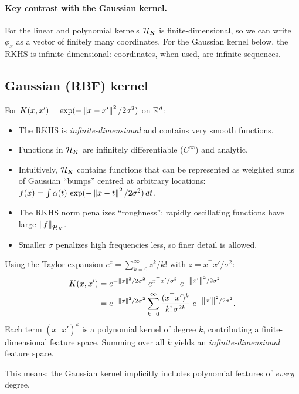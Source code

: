 \begin{notechapter}
\paragraph{Key contrast with the Gaussian kernel.}
For the linear and polynomial kernels $\mathcal{H}_K$ is finite-dimensional, so we can
write $\phi_x$ as a vector of finitely many coordinates. For the
Gaussian kernel below, the RKHS is
infinite-dimensional: coordinates, when used, are infinite sequences.

\subsection{Gaussian (RBF) kernel}

For $K(x,x') = \exp(-\left\|x-x'\right\|^2/2\sigma^2)$ on $\mathbb{R}^d$:
\begin{itemize}
  \item The RKHS is \emph{infinite-dimensional} and contains very
  smooth functions.
  \item Functions in $\mathcal{H}_K$ are infinitely differentiable ($C^\infty$)
  and analytic.
  \item Intuitively, $\mathcal{H}_K$ contains functions that can be represented as
  weighted sums of Gaussian ``bumps'' centred at arbitrary locations:
  $f(x) = \int \alpha(t)\,\exp(-\left\|x-t\right\|^2/2\sigma^2)\,dt$.
  \item The RKHS norm penalizes ``roughness'': rapidly oscillating
  functions have large $\left\|f\right\|_{\mathcal{H}_K}$.
  \item Smaller $\sigma$ penalizes high frequencies less, so finer detail is
  allowed.
\end{itemize}

\begin{intuition}
Using the Taylor expansion $e^z = \sum_{k=0}^\infty z^k/k!$ with $z =
x^\top x' / \sigma^2$:
\begin{align*}
K(x,x') &= e^{-\left\|x\right\|^2/2\sigma^2}\; e^{x^\top x'/\sigma^2}\; e^{-\left\|x'\right\|^2/2\sigma^2} \\
&= e^{-\left\|x\right\|^2/2\sigma^2} \sum_{k=0}^\infty \frac{(x^\top x')^k}{k!\,\sigma^{2k}}\; e^{-\left\|x'\right\|^2/2\sigma^2}.
\end{align*}
Each term $(x^\top x')^k$ is a polynomial kernel of degree $k$,
contributing a finite-dimensional feature space. Summing over all $k$
yields an \emph{infinite-dimensional} feature space.

This means: the Gaussian kernel implicitly includes polynomial features
of \emph{every} degree.
\end{intuition}


\end{notechapter}
